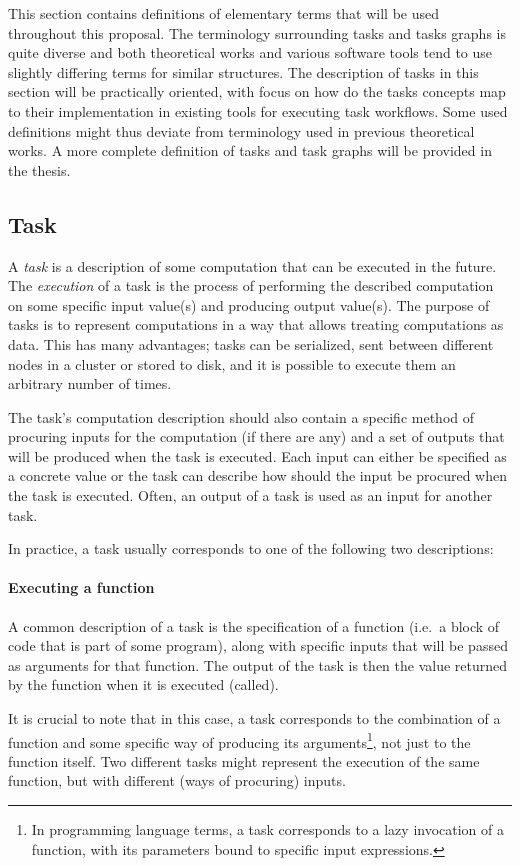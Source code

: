 This section contains definitions of elementary terms that will be used throughout this proposal.
The terminology surrounding tasks and tasks graphs is quite diverse and both theoretical works
and various software tools tend to use slightly differing terms for similar structures. The
description of tasks in this section will be practically oriented, with focus on how do the tasks
concepts map to their implementation in existing tools for executing task workflows. Some used
definitions might thus deviate from terminology used in previous theoretical works. A more
complete definition of tasks and task graphs will be provided in the thesis.

\subsection{Task}
A \emph{task} is a description of some computation that can be executed in the future. The
\textit{execution} of a task is the process of performing the described computation on some
specific input value(s) and producing output value(s). The purpose of tasks is to represent
computations in a way that allows treating computations as data. This has many advantages; tasks
can be serialized, sent between different nodes in a cluster or stored to disk, and it is possible
to execute them an arbitrary number of times.

The task's computation description should also contain a specific method of procuring inputs
for the computation (if there are any) and a set of outputs that will be produced when the task
is executed. Each input can either be specified as a concrete value or the task can describe how
should the input be procured when the task is executed. Often, an output of a task is used as
an input for another task.

In practice, a task usually corresponds to one of the following two descriptions:

\paragraph{Executing a function} A common description of a task is the specification of a
function (i.e.\ a block of code that is part of some program), along with specific inputs that will
be passed as arguments for that function. The output of the task is then the value returned by the
function when it is executed (called).

It is crucial to note that in this case, a task corresponds to the combination of a function and
some specific way of producing its arguments\footnote{In programming language terms, a task
corresponds to a lazy invocation of a function, with its parameters bound to specific input
expressions.}, not just to the function itself. Two different tasks might represent the
execution of the same function, but with different (ways of procuring) inputs.

